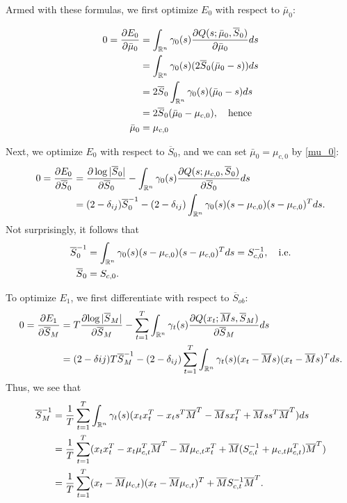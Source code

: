 \documentclass[12pt,leqno]{article}
\begin{document}
Armed with these formulas, we first optimize $E_0$ with respect to $\bar{\mu}_0$: 
 
\begin{align}
0 = \frac{\partial{E_0}}{\partial{\bar{\mu}_0}} &= \int_{{\mathbb R}^n}\gamma_0(s)\frac{\partial{Q(s;\bar{\mu}_0,\overline{S}_0)}}{\partial{\bar{\mu}_0}}ds \notag\\
&= \int_{{\mathbb R}^n}\gamma_0(s)(2\overline{S}_0(\bar{\mu}_0-s))ds\notag\\
&= 2\overline{S}_0\int_{{\mathbb R}^n}\gamma_0(s)(\bar{\mu}_0-s)ds \notag\\
&= 2\overline{S}_0(\bar{\mu}_0-\mu_{c,0}), \quad\text{hence}\notag\\
\bar{\mu}_0 &= \mu_{c,0}\label{mu_0}
\end{align}

Next, we optimize $E_0$ with respect to $\overline{S}_0$, and we can set $\bar{\mu}_0 = \mu_{c,0}$ by \eqref{mu_0}:
\begin{align*}
  0 = \frac{\partial{E_0}}{\partial{\overline{S}_0}} &= \frac{\partial\log|\overline{S}_0|}{\partial\overline{S}_0}
  -\int_{{\mathbb R}^n}\gamma_0(s)\frac{\partial{Q(s;\mu_{c,0},\overline{S}_0)}}{\partial\overline{S}_0}ds \\
&= (2-\delta_{ij})\overline{S}_0^{-1} - (2-\delta_{ij})\int_{{\mathbb R}^n}\gamma_0(s)(s-\mu_{c,0})(s-\mu_{c,0})^Tds.
\end{align*}
Not surprisingly, it follows that
\begin{equation}\label{Sigma_0}
  \begin{split}
    \overline{S}_0^{-1} &= \int_{{\mathbb R}^n}\gamma_0(s)(s-\mu_{c,0})(s-\mu_{c,0})^Tds = S_{c,0}^{-1}, \quad\text{i.e.}\\
    \overline{S}_0 &= S_{c,0}.
  \end{split}
\end{equation}

To optimize $E_1$, we first differentiate with respect to $\overline{S}_{ob}$:
\begin{align*}
  0 = \frac{\partial{E_1}}{\partial{\overline{S}_M}} &=
  T\frac{\partial{\log|\overline{S}_M|}}{\partial\overline{S}_M}
  - \sum_{t=1}^T\int_{{\mathbb R}^n}\gamma_t(s)\frac{\partial{Q(x_t;\overline{M}s,\overline{S}_M)}}{\partial{\overline{S}_M}}ds \\
  &= (2-\delta{ij})T\overline{S}_M^{-1} - (2-\delta_{ij})\sum_{t=1}^T
  \int_{{\mathbb R}^n}\gamma_t(s)(x_t-\overline{M}s)(x_t-\overline{M}s)^Tds.
\end{align*}
Thus,  we see that
\begin{equation}\label{S_Ob}
  \begin{split}
    \overline{S}_M^{-1} &= \frac{1}{T}\sum_{t=1}^T\int_{{\mathbb R}^n}\gamma_t(s)(x_tx_t^T - x_ts^T\overline{M}^T
    - \overline{M}sx_t^T + \overline{M}ss^T\overline{M}^T)ds \\
    &= \frac{1}{T}\sum_{t=1}^T(x_tx_t^T - x_t\mu_{c,t}^T\overline{M}^T - \overline{M}\mu_{c,t}x_t^T +
    \overline{M}(S_{c,t}^{-1}+\mu_{c,t}\mu_{c,t}^T)\overline{M}^T)\\
    &= \frac{1}{T}\sum_{t=1}^T(x_t-\overline{M}\mu_{c,t})(x_t-\overline{M}\mu_{c,t})^T +
    \overline{M}S_{c,t}^{-1}\overline{M}^T.
  \end{split}
\end{equation}
\end{document}
